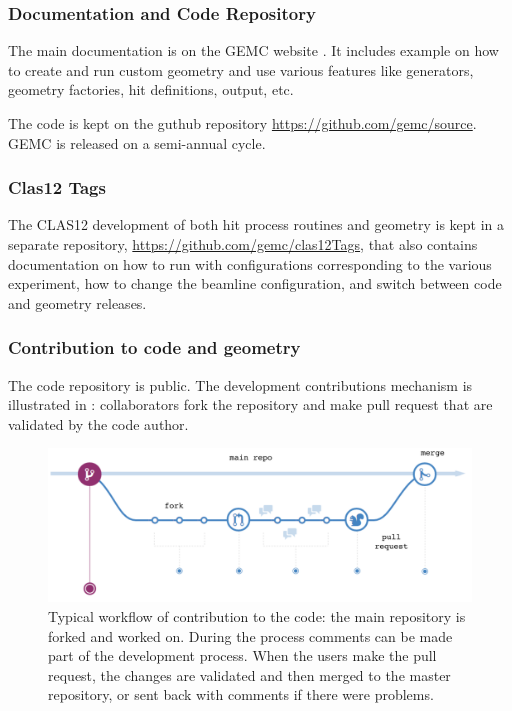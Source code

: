 \subsubsection{Documentation and Code Repository}

The main documentation is on the GEMC website \cite{gemc}. It includes example on how to create and run custom geometry
and use various features like generators, geometry factories, hit definitions, output, etc.

The code is kept on the guthub repository \url{https://github.com/gemc/source}. GEMC is released on a semi-annual cycle.

\subsubsection{Clas12 Tags}
The CLAS12 development of both hit process routines and geometry is kept in a separate repository, \url{https://github.com/gemc/clas12Tags},
that also contains documentation on how to run with configurations corresponding to the various experiment, how to change the
beamline configuration, and switch between code and geometry releases.


\subsubsection{Contribution to code and geometry}

The code repository is public. The development contributions mechanism is illustrated in : collaborators fork the repository
and make pull request that are validated by the code author.

\begin{figure}
	\centering
	\includegraphics[width=0.95\columnwidth,keepaspectratio]{img/github.png}
	\caption{Typical workflow of contribution to the code: the main repository is forked and worked on. During the process comments
             can be made part of the development process. When the users make the pull request, the changes are validated and then merged
             to the master repository, or sent back with comments if there were problems.}
	\label{fig:github}
\end{figure}




